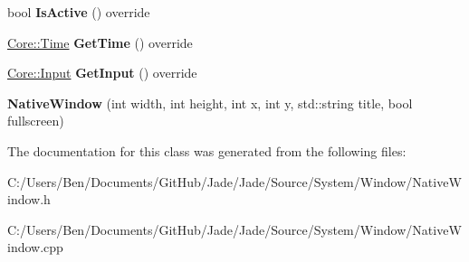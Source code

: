 \begin{DoxyCompactItemize}
\item 
\hypertarget{class_jade_1_1_system_1_1_native_window_a599df3a529a57565c3608af5d17a7aa0}{}bool {\bfseries Is\+Active} () override\label{class_jade_1_1_system_1_1_native_window_a599df3a529a57565c3608af5d17a7aa0}

\item 
\hypertarget{class_jade_1_1_system_1_1_native_window_a402c9f4e3b94278b452c89369a0c05e0}{}\hyperlink{class_jade_1_1_core_1_1_time}{Core\+::\+Time} {\bfseries Get\+Time} () override\label{class_jade_1_1_system_1_1_native_window_a402c9f4e3b94278b452c89369a0c05e0}

\item 
\hypertarget{class_jade_1_1_system_1_1_native_window_a47c598a016767c69b4f4d70f51826304}{}\hyperlink{struct_jade_1_1_core_1_1_input}{Core\+::\+Input} {\bfseries Get\+Input} () override\label{class_jade_1_1_system_1_1_native_window_a47c598a016767c69b4f4d70f51826304}

\item 
\hypertarget{class_jade_1_1_system_1_1_native_window_a5798bbff6f1d6dd8c0ada281b93de7a5}{}{\bfseries Native\+Window} (int width, int height, int x, int y, std\+::string title, bool fullscreen)\label{class_jade_1_1_system_1_1_native_window_a5798bbff6f1d6dd8c0ada281b93de7a5}

\end{DoxyCompactItemize}


The documentation for this class was generated from the following files\+:\begin{DoxyCompactItemize}
\item 
C\+:/\+Users/\+Ben/\+Documents/\+Git\+Hub/\+Jade/\+Jade/\+Source/\+System/\+Window/Native\+Window.\+h\item 
C\+:/\+Users/\+Ben/\+Documents/\+Git\+Hub/\+Jade/\+Jade/\+Source/\+System/\+Window/Native\+Window.\+cpp\end{DoxyCompactItemize}
